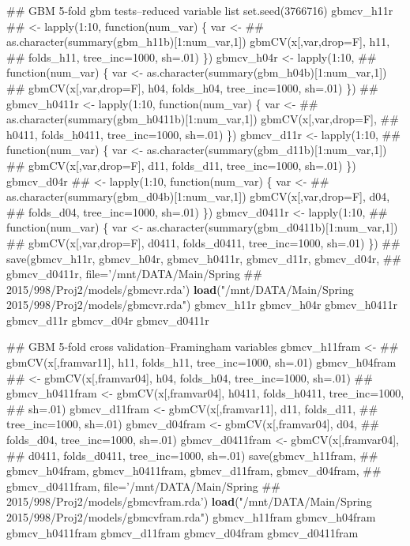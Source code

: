\documentclass[11pt,]{article}
\newenvironment{Shaded}{\begin{snugshade}}{\end{snugshade}}
\newcommand{\KeywordTok}[1]{\textcolor[rgb]{0.13,0.29,0.53}{\textbf{{#1}}}}
\newcommand{\StringTok}[1]{\textcolor[rgb]{0.31,0.60,0.02}{{#1}}}
\newcommand{\NormalTok}[1]{{#1}}
\begin{document}
\begin{Shaded}
\begin{Highlighting}[]
{\NormalTok{## GBM 5-fold gbm tests--reduced variable list set.seed(3766716) gbmcv_h11r}
\NormalTok{## <- lapply(1:10, function(num_var) \{ var <-}
\NormalTok{## as.character(summary(gbm_h11b)[1:num_var,1]) gbmCV(x[,var,drop=F], h11,}
\NormalTok{## folds_h11, tree_inc=1000, sh=.01) \}) gbmcv_h04r <- lapply(1:10,}
\NormalTok{## function(num_var) \{ var <- as.character(summary(gbm_h04b)[1:num_var,1])}
\NormalTok{## gbmCV(x[,var,drop=F], h04, folds_h04, tree_inc=1000, sh=.01) \})}
\NormalTok{## gbmcv_h0411r <- lapply(1:10, function(num_var) \{ var <-}
\NormalTok{## as.character(summary(gbm_h0411b)[1:num_var,1]) gbmCV(x[,var,drop=F],}
\NormalTok{## h0411, folds_h0411, tree_inc=1000, sh=.01) \}) gbmcv_d11r <- lapply(1:10,}
\NormalTok{## function(num_var) \{ var <- as.character(summary(gbm_d11b)[1:num_var,1])}
\NormalTok{## gbmCV(x[,var,drop=F], d11, folds_d11, tree_inc=1000, sh=.01) \}) gbmcv_d04r}
\NormalTok{## <- lapply(1:10, function(num_var) \{ var <-}
\NormalTok{## as.character(summary(gbm_d04b)[1:num_var,1]) gbmCV(x[,var,drop=F], d04,}
\NormalTok{## folds_d04, tree_inc=1000, sh=.01) \}) gbmcv_d0411r <- lapply(1:10,}
\NormalTok{## function(num_var) \{ var <- as.character(summary(gbm_d0411b)[1:num_var,1])}
\NormalTok{## gbmCV(x[,var,drop=F], d0411, folds_d0411, tree_inc=1000, sh=.01) \})}
\NormalTok{## save(gbmcv_h11r, gbmcv_h04r, gbmcv_h0411r, gbmcv_d11r, gbmcv_d04r,}
\NormalTok{## gbmcv_d0411r, file='/mnt/DATA/Main/Spring}
\NormalTok{## 2015/998/Proj2/models/gbmcvr.rda')}
\KeywordTok{load}\NormalTok{(}\StringTok{"/mnt/DATA/Main/Spring 2015/998/Proj2/models/gbmcvr.rda"}\NormalTok{)}
\NormalTok{gbmcv_h11r}
\NormalTok{gbmcv_h04r}
\NormalTok{gbmcv_h0411r}
\NormalTok{gbmcv_d11r}
\NormalTok{gbmcv_d04r}
\NormalTok{gbmcv_d0411r}

\NormalTok{## GBM 5-fold cross validation--Framingham variables gbmcv_h11fram <-}
\NormalTok{## gbmCV(x[,framvar11], h11, folds_h11, tree_inc=1000, sh=.01) gbmcv_h04fram}
\NormalTok{## <- gbmCV(x[,framvar04], h04, folds_h04, tree_inc=1000, sh=.01)}
\NormalTok{## gbmcv_h0411fram <- gbmCV(x[,framvar04], h0411, folds_h0411, tree_inc=1000,}
\NormalTok{## sh=.01) gbmcv_d11fram <- gbmCV(x[,framvar11], d11, folds_d11,}
\NormalTok{## tree_inc=1000, sh=.01) gbmcv_d04fram <- gbmCV(x[,framvar04], d04,}
\NormalTok{## folds_d04, tree_inc=1000, sh=.01) gbmcv_d0411fram <- gbmCV(x[,framvar04],}
\NormalTok{## d0411, folds_d0411, tree_inc=1000, sh=.01) save(gbmcv_h11fram,}
\NormalTok{## gbmcv_h04fram, gbmcv_h0411fram, gbmcv_d11fram, gbmcv_d04fram,}
\NormalTok{## gbmcv_d0411fram, file='/mnt/DATA/Main/Spring}
\NormalTok{## 2015/998/Proj2/models/gbmcvfram.rda')}
\KeywordTok{load}\NormalTok{(}\StringTok{"/mnt/DATA/Main/Spring 2015/998/Proj2/models/gbmcvfram.rda"}\NormalTok{)}
\NormalTok{gbmcv_h11fram}
\NormalTok{gbmcv_h04fram}
\NormalTok{gbmcv_h0411fram}
\NormalTok{gbmcv_d11fram}
\NormalTok{gbmcv_d04fram}
\NormalTok{gbmcv_d0411fram}

}
\end{Highlighting}
\end{Shaded}
\end{document}
